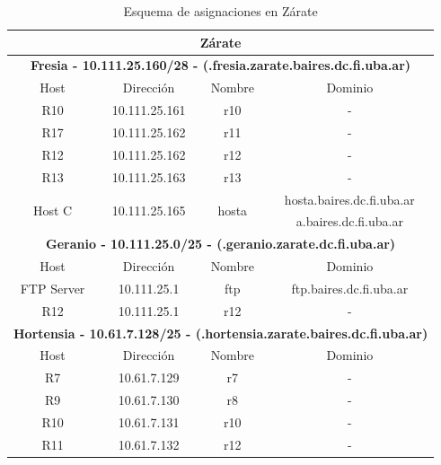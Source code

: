 \begin{table}[!tbp]
	\centering
	\begin{tabular}{|c|c|c|c|}   
		\hline
		\multicolumn{4}{|c|}{\textbf{Zárate}} \\
		\hline
		\hline
		\multicolumn{4}{|c|}{\textbf{Fresia - 10.111.25.160/28 - (.fresia.zarate.baires.dc.fi.uba.ar)}} \\
		\hline
		Host & Dirección & Nombre & Dominio \\
		\hline
		R10 & 10.111.25.161 & r10 & - \\
		\hline 
		R17 & 10.111.25.162 & r11 & - \\
		\hline
		R12 & 10.111.25.162 & r12 & - \\
		\hline
		R13 & 10.111.25.163 & r13 & - \\
 		\hline
		\multirow{2}{*}{Host C} & \multirow{2}{*}{10.111.25.165} & \multirow{2}{*}{hosta} & hosta.baires.dc.fi.uba.ar \\
			& & & a.baires.dc.fi.uba.ar \\
		\hline
		\hline
		\multicolumn{4}{|c|}{\textbf{Geranio - 10.111.25.0/25 - (.geranio.zarate.dc.fi.uba.ar)}} \\
		\hline
		Host & Dirección & Nombre & Dominio \\
		\hline
		FTP Server & 10.111.25.1 & ftp & ftp.baires.dc.fi.uba.ar \\
		\hline
		R12 & 10.111.25.1 & r12 & - \\
		\hline
		\hline
		\multicolumn{4}{|c|}{\textbf{Hortensia - 10.61.7.128/25 - (.hortensia.zarate.baires.dc.fi.uba.ar)}} \\
		\hline
		Host & Dirección & Nombre & Dominio \\
		\hline
		R7 & 10.61.7.129 & r7 & - \\
		\hline
		R9 & 10.61.7.130 & r8 & - \\
		\hline
		R10 & 10.61.7.131 & r10 & - \\
		\hline
		R11 & 10.61.7.132 & r12 & - \\
		\hline
 	\end{tabular}
	\caption{Esquema de asignaciones en Zárate}
\end{table}
